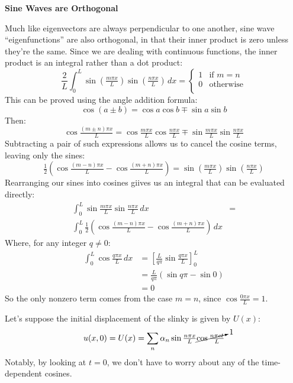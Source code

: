 \documentclass{article}
\renewenvironment{quote}{\begin{shaded*}\begin{oldquote}}{\end{oldquote}\end{shaded*}}
\begin{document}
\begin{quote}
    \textbf{Sine Waves are Orthogonal}

    Much like eigenvectors are always perpendicular to one another, sine wave ``eigenfunctions'' are also orthogonal, in that their inner product is zero unless they're the same. Since we are dealing with continuous functions, the inner product is an integral rather than a dot product:
    $$
    \frac{2}{L}
    \displaystyle \int_0^L \sin \left( \tfrac{m \pi x}{L} \right) \sin \left( \tfrac{n \pi x}{L} \right) \, dx
    =
    \left\{
        \begin{array}{cl}
          1 & \text{if $m=n$} \\
          0 & \text{otherwise} \\
        \end{array}
        \right.    
    $$
    This can be proved using the angle addition formula:
    $$
        \cos \left( a \pm b \right) = \cos a \cos b \mp \sin a \sin b
    $$
    Then:
    $$
        \cos \tfrac{(m\pm n) \pi x}{L} = 
            \cos \tfrac{m \pi x}{L} \cos \tfrac{n \pi x}{L} \mp
            \sin \tfrac{m \pi x}{L} \sin \tfrac{n \pi x}{L} 
    $$
    Subtracting a pair of such expressions allows us to cancel the cosine terms, leaving only the sines:
    $$
    \tfrac{1}{2} \left(
    \cos \tfrac{(m-n) \pi x}{L} -
    \cos \tfrac{(m+n) \pi x}{L} 
    \right)
    = 
        \sin \left( \tfrac{m \pi x}{L} \right) \sin \left( \tfrac{n \pi x}{L} \right)
    $$    
    Rearranging our sines into cosines giives us an integral that can be evaluated directly:
    \begin{align*}
        \displaystyle \int_0^L \sin \tfrac{m \pi x}{L} \sin \tfrac{n \pi x}{L} \, dx &= \\
        \displaystyle \int_0^L \tfrac{1}{2} \left(
    \cos \tfrac{(m-n) \pi x}{L} -
    \cos \tfrac{(m+n) \pi x}{L} 
    \right) \, dx
    \end{align*}
    Where, for any integer $q \not= 0$:
    \begin{align*}
    \displaystyle \int_0^L \cos \tfrac{q \pi x}{L} \, dx &=
    \left[ \tfrac{L}{q\pi} \sin \tfrac{q \pi x}{L} \right]^L_0 \\
    &= \tfrac{L}{q\pi} \left( \sin q\pi - \sin 0 \right) \\
    &= 0
    \end{align*}    
    So the only nonzero term comes from the case $m=n$, since ${\cos \frac{0\pi x}{L}=1}$. 
\end{quote}
Let's suppose the initial displacement of the slinky is given by $U(x)$:
$$
u(x, 0) = U(x) = \displaystyle\sum_n \alpha_n \sin \tfrac{n\pi x}{L} \cancelto{1}{\cos \tfrac{n \pi c t}{L}}
$$
Notably, by looking at $t=0$, we don't have to worry about any of the time-dependent cosines. 
\end{document}
